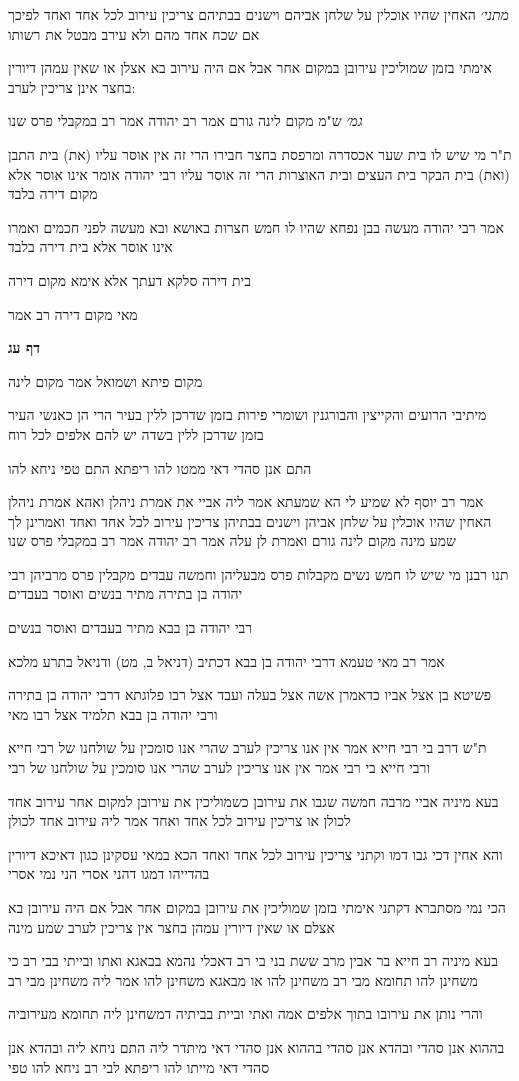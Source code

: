 \documentclass[12pt, openany]{book}
\newcommand{\sethebfont}{
\fontsize{10.5pt}{21.0pt} \selectfont
}
\newcommand{\textblock}[1]{
{\sethebfont #1\\}	
}
\newcommand{\sectname}{}
\newcommand{\newsection}[1]{
	\addcontentsline{toc}{section}{#1}
	\renewcommand{\sectname}{#1}	
	\vspace{-\baselineskip}
	\begin{center}
		\textbf{%
\fontsize{16pt}{16pt}\selectfont
			#1}
	\end{center}
	\vspace{-\baselineskip}
	\nopagebreak
}
\begin{document}
\textblock{{\large\emph{מתני׳}} האחין שהיו אוכלין על שלחן אביהם וישנים בבתיהם צריכין עירוב לכל אחד ואחד לפיכך אם שכח אחד מהם ולא עירב מבטל את רשותו}
\textblock{אימתי בזמן שמוליכין עירובן במקום אחר אבל אם היה עירוב בא אצלן או שאין עמהן דיורין בחצר אינן צריכין לערב:}
\textblock{{\large\emph{גמ׳}} ש"מ מקום לינה גורם אמר רב יהודה אמר רב במקבלי פרס שנו}
\textblock{ת"ר מי שיש לו בית שער אכסדרה ומרפסת בחצר חבירו הרי זה אין אוסר עליו (את) בית התבן (ואת) בית הבקר בית העצים ובית האוצרות הרי זה אוסר עליו רבי יהודה אומר אינו אוסר אלא מקום דירה בלבד}
\textblock{אמר רבי יהודה מעשה בבן נפחא שהיו לו חמש חצרות באושא ובא מעשה לפני חכמים ואמרו אינו אוסר אלא בית דירה בלבד}
\textblock{בית דירה סלקא דעתך אלא אימא מקום דירה}
\textblock{מאי מקום דירה רב אמר}
\newsection{דף עג}
\textblock{מקום פיתא ושמואל אמר מקום לינה}
\textblock{מיתיבי הרועים והקייצין והבורגנין ושומרי פירות בזמן שדרכן ללין בעיר הרי הן כאנשי העיר בזמן שדרכן ללין בשדה יש להם אלפים לכל רוח}
\textblock{התם אנן סהדי דאי ממטו להו ריפתא התם טפי ניחא להו}
\textblock{אמר רב יוסף לא שמיע לי הא שמעתא אמר ליה אביי את אמרת ניהלן ואהא אמרת ניהלן האחין שהיו אוכלין על שלחן אביהן וישנים בבתיהן צריכין עירוב לכל אחד ואחד ואמרינן לך שמע מינה מקום לינה גורם ואמרת לן עלה אמר רב יהודה אמר רב במקבלי פרס שנו}
\textblock{תנו רבנן מי שיש לו חמש נשים מקבלות פרס מבעליהן וחמשה עבדים מקבלין פרס מרביהן רבי יהודה בן בתירה מתיר בנשים ואוסר בעבדים}
\textblock{רבי יהודה בן בבא מתיר בעבדים ואוסר בנשים}
\textblock{אמר רב מאי טעמא דרבי יהודה בן בבא דכתיב (דניאל ב, מט) ודניאל בתרע מלכא}
\textblock{פשיטא בן אצל אביו כדאמרן אשה אצל בעלה ועבד אצל רבו פלוגתא דרבי יהודה בן בתירה ורבי יהודה בן בבא תלמיד אצל רבו מאי}
\textblock{ת"ש דרב בי רבי חייא אמר אין אנו צריכין לערב שהרי אנו סומכין על שולחנו של רבי חייא ורבי חייא בי רבי אמר אין אנו צריכין לערב שהרי אנו סומכין על שולחנו של רבי}
\textblock{בעא מיניה אביי מרבה חמשה שגבו את עירובן כשמוליכין את עירובן למקום אחר עירוב אחד לכולן או צריכין עירוב לכל אחד ואחד אמר ליה עירוב אחד לכולן}
\textblock{והא אחין דכי גבו דמו וקתני צריכין עירוב לכל אחד ואחד הכא במאי עסקינן כגון דאיכא דיורין בהדייהו דמגו דהני אסרי הני נמי אסרי}
\textblock{הכי נמי מסתברא דקתני אימתי בזמן שמוליכין את עירובן במקום אחר אבל אם היה עירובן בא אצלם או שאין דיורין עמהן בחצר אין צריכין לערב שמע מינה}
\textblock{בעא מיניה רב חייא בר אבין מרב ששת בני בי רב דאכלי נהמא בבאגא ואתו ובייתי בבי רב כי משחינן להו תחומא מבי רב משחינן להו או מבאגא משחינן להו אמר ליה משחינן מבי רב}
\textblock{והרי נותן את עירובו בתוך אלפים אמה ואתי וביית בביתיה דמשחינן ליה תחומא מעירוביה}
\textblock{בההוא אנן סהדי ובהדא אנן סהדי בההוא אנן סהדי דאי מיתדר ליה התם ניחא ליה ובהדא אנן סהדי דאי מייתו להו ריפתא לבי רב ניחא להו טפי}
\end{document}
